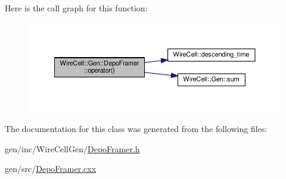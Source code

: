 Here is the call graph for this function\+:
\nopagebreak
\begin{figure}[H]
\begin{center}
\leavevmode
\includegraphics[width=350pt]{class_wire_cell_1_1_gen_1_1_depo_framer_a6ad456e0ccd9361b047b5f3f8b89fbd6_cgraph}
\end{center}
\end{figure}


The documentation for this class was generated from the following files\+:\begin{DoxyCompactItemize}
\item 
gen/inc/\+Wire\+Cell\+Gen/\hyperlink{_depo_framer_8h}{Depo\+Framer.\+h}\item 
gen/src/\hyperlink{_depo_framer_8cxx}{Depo\+Framer.\+cxx}\end{DoxyCompactItemize}

